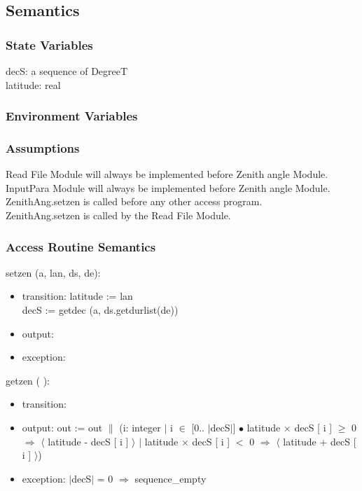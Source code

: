 \documentclass[12pt, titlepage]{article}
\begin{document}
\subsection{Semantics}

\subsubsection{State Variables}

decS: a sequence of DegreeT\\
latitude: real\\



\subsubsection{Environment Variables}




\subsubsection{Assumptions}
Read File Module will always be implemented before Zenith angle Module. \\
InputPara Module will always be implemented before Zenith angle Module.\\
ZenithAng.setzen is called before any other access program.\\
ZenithAng.setzen is called by the Read File Module.


\subsubsection{ Access Routine Semantics}


\noindent setzen (a, lan, ds, de):
\begin{itemize}
\item transition: latitude := lan\\
decS := getdec (a, ds.getdurlist(de))
\item output: 
\item exception: 
\end{itemize}

\noindent  getzen ( ):
\begin{itemize}
\item transition:

\item output: out := out $\|$ (i: integer $|$ i $\in$ [0.. $|$decS$|$] $\bullet$ latitude $\times$ decS [ i ] $\geq$ 0 $\Rightarrow$ $\langle$ latitude - decS [  i ] $\rangle$ $|$ latitude $\times$ decS [ i ] $<$ 0 $\Rightarrow$ $\langle$ latitude + decS [ i ] $\rangle$)\\


\item exception: $|$decS$|$ = 0 $\Rightarrow$ sequence\_empty
\end{itemize}
\end{document}

